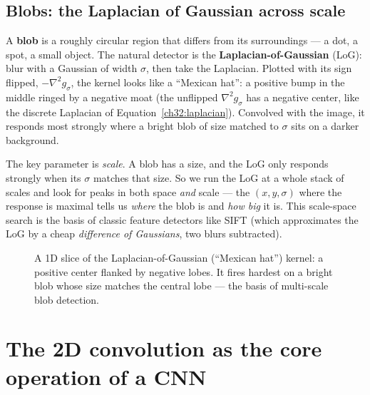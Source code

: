 \subsection{Blobs: the Laplacian of Gaussian across scale}

A \textbf{blob} is a roughly circular region that differs from its surroundings
--- a dot, a spot, a small object. The natural detector is the
\textbf{Laplacian-of-Gaussian} (LoG): blur with a Gaussian of width $\sigma$,
then take the Laplacian. Plotted with its sign flipped, $-\nabla^2 g_\sigma$, the
kernel looks like a ``Mexican hat'': a positive bump in the middle ringed by a
negative moat (the unflipped $\nabla^2 g_\sigma$ has a negative center, like the
discrete Laplacian of Equation~\eqref{ch32:laplacian}). Convolved with the image, it
responds most strongly where a bright blob of size matched to $\sigma$ sits on a
darker background.

The key parameter is \emph{scale}. A blob has a size, and the LoG only responds
strongly when its $\sigma$ matches that size. So we run the LoG at a whole stack
of scales and look for peaks in both space \emph{and} scale --- the
$(x, y, \sigma)$ where the response is maximal tells us \emph{where} the blob is
and \emph{how big} it is. This scale-space search is the basis of classic
feature detectors like SIFT (which approximates the LoG by a cheap
\emph{difference of Gaussians}, two blurs subtracted).

\begin{figure}[H]
\centering
{}
\caption{A 1D slice of the Laplacian-of-Gaussian (``Mexican hat'') kernel: a
positive center flanked by negative lobes. It fires hardest on a bright blob
whose size matches the central lobe --- the basis of multi-scale blob
detection.}
\label{ch32:fig-log}
\end{figure}

\section{The 2D convolution as the core operation of a CNN}
\label{ch32:cnn}

